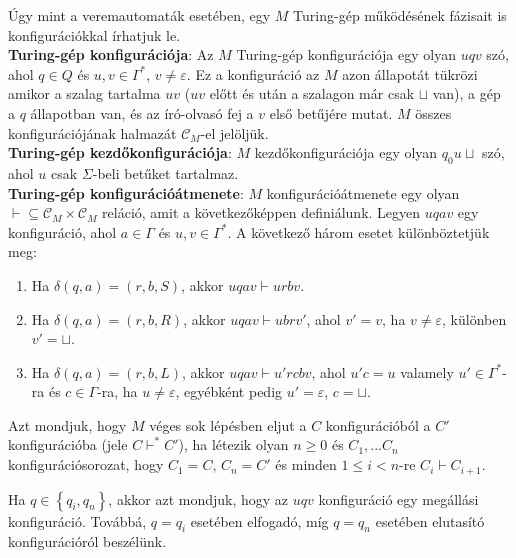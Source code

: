 \documentclass[margin=0px]{article}
\begin{document}
Úgy mint a veremautomaták esetében, egy $M$ Turing-gép működésének fázisait	is konfigurációkkal írhatjuk le.\\

\noindent \textbf{Turing-gép konfigurációja}: Az $M$ Turing-gép konfigurációja egy olyan $uqv$ szó, ahol
$q \in Q$ és $u, v \in \Gamma^{*}$, $v \not = \varepsilon$. Ez a konfiguráció az $M$ azon állapotát tükrözi
amikor a szalag tartalma $uv$ ($uv$ előtt és után a szalagon már csak $\sqcup$ van), a gép a $q$ állapotban van,
és az író-olvasó fej a $v$ első betűjére mutat. $M$ összes konfigurációjának halmazát $\mathcal{C}_{M}$-el jelöljük.\\

\noindent \textbf{Turing-gép kezdőkonfigurációja}: $M$ kezdőkonfigurációja egy olyan $q_{0}u\sqcup$ szó, ahol
$u$ csak $\Sigma$-beli betűket tartalmaz.\\

\noindent \textbf{Turing-gép konfigurációátmenete}: $M$ konfigurációátmenete egy olyan
$\vdash \subseteq \mathcal{C}_{M} \times \mathcal{C}_{M}$ reláció, amit a következőképpen definiálunk.
Legyen $uqav$ egy konfiguráció, ahol $a \in \Gamma$ és $u, v \in \Gamma^{*}$. A következő három esetet
különböztetjük meg:

\begin{enumerate}

    \item	Ha $\delta(q,a) = (r, b, S)$, akkor $uqav \vdash urbv$.

    \item	Ha $\delta(q,a) = (r, b, R)$, akkor $uqav \vdash ubrv'$, ahol $v' = v$, ha $v \not = \varepsilon$, különben
          $v' = \sqcup$.

    \item	Ha $\delta(q,a) = (r, b, L)$, akkor $uqav \vdash u'rcbv$, ahol $u'c = u$ valamely $u' \in \Gamma^{*}$-ra
          és $c \in \Gamma$-ra, ha $u \not = \varepsilon$, egyébként pedig $u' = \varepsilon$, $c = \sqcup$.

\end{enumerate}

Azt mondjuk, hogy $M$ véges sok lépésben eljut a $C$ konfigurációból a  $C'$ konfigurációba (jele $C \vdash^{*} C'$),
ha létezik olyan $n \geq 0$ és $C_{1}, ... C_{n}$ konfigurációsorozat, hogy $C_{1} = C$, $C_{n} = C'$ és minden
$1 \leq i < n$-re $C_{i} \vdash C_{i+1}$.

Ha $q \in \left\{q_{i}, q_{n}\right\}$, akkor azt mondjuk, hogy az $uqv$ konfiguráció egy megállási
konfiguráció. Továbbá, $q = q_{i}$ esetében elfogadó, míg $q = q_{n}$ esetében elutasító
konfigurációról beszélünk.\\
\end{document}
